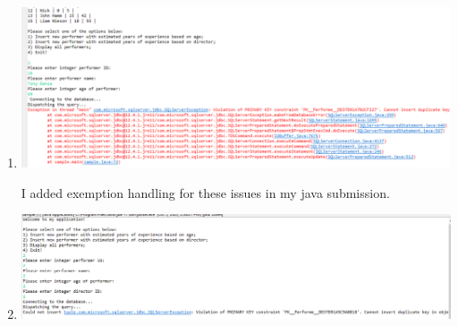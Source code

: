 \documentclass[11pt]{article}
\begin{document}
\begin{enumerate}
\item \includegraphics[width = \textwidth]{Insert1.2.DuplicateKeyError.png}  

I added exemption handling for these issues in my java submission.  
\item \includegraphics[width = \textwidth]{Insert1.3.png}




\end{enumerate}
\end{document}
